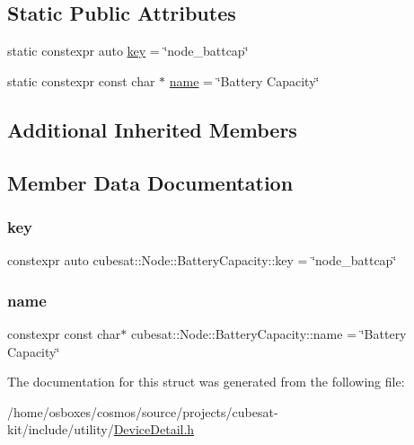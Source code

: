\subsection*{Static Public Attributes}
\begin{DoxyCompactItemize}
\item 
static constexpr auto \hyperlink{structcubesat_1_1Node_1_1BatteryCapacity_a2e14eaa079b2b98d34cc7f35f649ba1d}{key} = \char`\"{}node\+\_\+battcap\char`\"{}
\item 
static constexpr const char $\ast$ \hyperlink{structcubesat_1_1Node_1_1BatteryCapacity_a5e60db41b41d845dae7415be9eb258c7}{name} = \char`\"{}Battery Capacity\char`\"{}
\end{DoxyCompactItemize}
\subsection*{Additional Inherited Members}


\subsection{Member Data Documentation}
\mbox{\label{structcubesat_1_1Node_1_1BatteryCapacity_a2e14eaa079b2b98d34cc7f35f649ba1d}} 
\subsubsection{\texorpdfstring{key}{key}}
{\footnotesize\ttfamily constexpr auto cubesat\+::\+Node\+::\+Battery\+Capacity\+::key = \char`\"{}node\+\_\+battcap\char`\"{}\hspace{0.3cm}{\ttfamily [static]}}

\mbox{\label{structcubesat_1_1Node_1_1BatteryCapacity_a5e60db41b41d845dae7415be9eb258c7}} 
\subsubsection{\texorpdfstring{name}{name}}
{\footnotesize\ttfamily constexpr const char$\ast$ cubesat\+::\+Node\+::\+Battery\+Capacity\+::name = \char`\"{}Battery Capacity\char`\"{}\hspace{0.3cm}{\ttfamily [static]}}



The documentation for this struct was generated from the following file\+:\begin{DoxyCompactItemize}
\item 
/home/osboxes/cosmos/source/projects/cubesat-\/kit/include/utility/\hyperlink{DeviceDetail_8h}{Device\+Detail.\+h}\end{DoxyCompactItemize}

